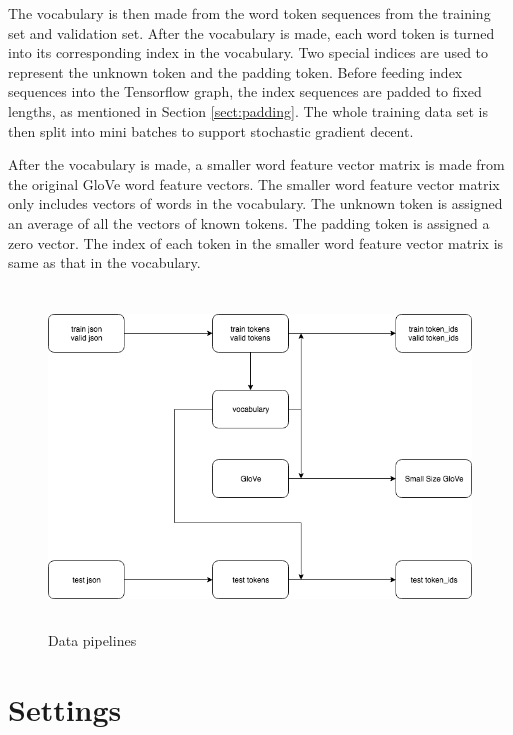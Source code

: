 \documentclass[modernstyle,12pt]{sjsuthesis}
\theoremstyle{definition}
\begin{document}
The vocabulary is then made from the word token sequences from the training set and validation set. After the vocabulary is made, each word token is turned into its corresponding index in the vocabulary. Two special indices are used to represent the unknown token and the padding token. Before feeding index sequences into the Tensorflow graph, the index sequences are padded to fixed lengths, as mentioned in Section \ref{sect:padding}. The whole training data set is then split into mini batches to support stochastic gradient decent.

After the vocabulary is made, a smaller word feature vector matrix is made from the original GloVe word feature vectors. The smaller word feature vector matrix only includes vectors of words in the vocabulary. The unknown token is assigned an average of all the vectors of known tokens. The padding token is assigned a zero vector. The index of each token in the smaller word feature vector matrix is same as that in the vocabulary.

\begin{figure}[htbp]\centering
  \includegraphics[width=12cm, height=9cm]{figures/data.png}
  \caption{Data pipelines}
  \label{f:data}
\end{figure}




\section{Settings}
\end{document}
